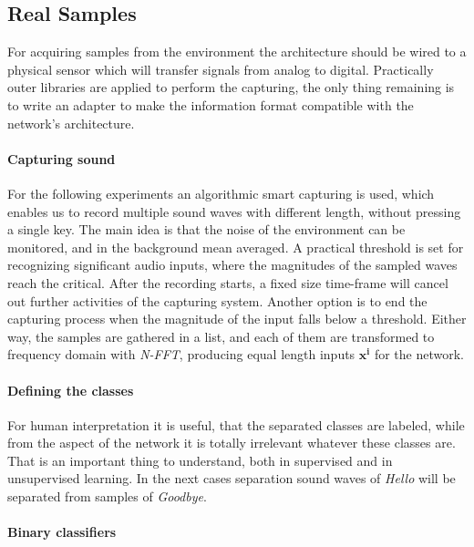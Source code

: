 \subsection{Real Samples}
For acquiring samples from the environment the architecture should be wired to a physical sensor which will transfer signals from analog to digital. 
Practically outer libraries are applied to perform the capturing, the only thing remaining is to write an adapter to make the information format compatible with the network's architecture.

\paragraph{Capturing sound}
For the following experiments an algorithmic smart capturing is used, which enables us to record multiple sound waves with different length, without pressing a single key. The main idea is that the noise of the environment can be monitored, and in the background mean averaged. A practical threshold is set for recognizing significant audio inputs, where the magnitudes of the sampled waves reach the critical. After the recording starts, a fixed size time-frame will cancel out further activities of the capturing system. Another option is to end the capturing process when the magnitude of the input falls below a threshold. Either way, the samples are gathered in a list, and each of them are transformed to frequency domain with \emph{N-FFT}, producing equal length inputs  $\mathbf{x^i}$ for the network.

\paragraph{Defining the classes}
For human interpretation it is useful, that the separated classes are labeled, while from the aspect of the network it is totally irrelevant whatever these classes are. That is an important thing to understand, both in supervised and in unsupervised learning. In the next cases separation sound waves of \emph{Hello} will be separated from samples of \emph{Goodbye}.

\paragraph{Binary classifiers}
